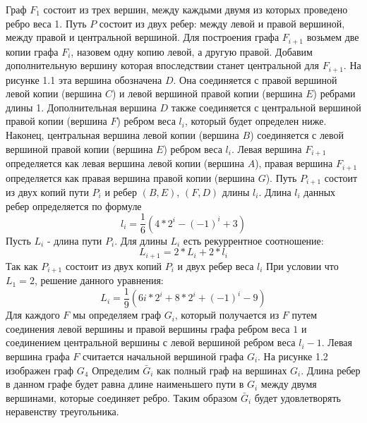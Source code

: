 \documentclass[a4paper, 14pt]{extarticle}
\numberwithin{equation}{section}
\begin{document}
Граф $F_1$ состоит из трех вершин, между каждыми двумя из которых проведено ребро веса 1. Путь $P$ состоит из двух ребер: между левой и правой вершиной, между правой и центральной вершиной. Для построения графа $F_{i+1}$ возьмем две копии графа $F_i$, назовем одну копию левой, а другую правой. Добавим дополнительную вершину которая впоследствии станет центральной для $F_{i+1}$. На рисунке 1.1 эта вершина обозначена $D$. Она соединяется с правой вершиной левой копии (вершина $C$) и левой вершиной правой копии (вершина $E$) ребрами длины 1. Дополнительная вершина $D$ также соединяется с центральной вершиной правой копии (вершина $F$) ребром веса $l_i$, который будет определен ниже. Наконец, центральная вершина левой копии (вершина $B$) соединяется с левой вершиной правой копии (вершина $E$) ребром веса $l_i$. Левая вершина $F_{i+1}$ определяется как левая вершина левой копии (вершина $A$), правая вершина $F_{i+1}$ определяется как правая вершина правой копии (вершина $G$). Путь $P_{i+1}$ состоит из двух копий пути $P_i$ и ребер $(B,E)$, $(F,D)$ длины  $l_i$. Длина $l_i$ данных ребер определяется по формуле
\begin{equation}\label{2.11}
l_i = \frac{1}{6}(4*2^i-(-1)^i+3)
\end{equation}
Пусть $L_i$ - длина пути $P_i$. Для длины $L_i$ есть рекуррентное соотношение:
\begin{equation}
L_{i+1} = 2*L_i+2*l_i
\end{equation}
Так как $P_{i+1}$ состоит из двух копий $P_i$ и двух ребер веса $l_i$ При условии что $L_1=2$, решение данного уравнения: 
\begin{equation}
L_i=\frac{1}{9}(6i*2^i+8*2^i+(-1)^i-9)
\end{equation}
Для каждого $F$ мы определяем граф $G_i$, который получается из $F$ путем соединения левой вершины и правой вершины графа ребром веса $1$ и соединением центральной вершины с левой вершиной ребром веса $l_i-1$. Левая вершина графа $F$ считается начальной вершиной графа $G_i$. На рисунке 1.2 изображен граф $G_4$ Определим $\bar G_i$ как полный граф на вершинах $G_i$. Длина ребер в данном графе будет равна длине наименьшего пути в $G_i$ между двумя вершинами, которые соединяет ребро. Таким образом $\bar G_i$ будет удовлетворять неравенству треугольника.
\end{document}
